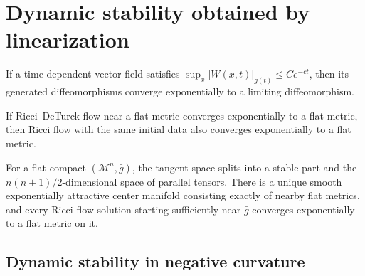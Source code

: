 \section{Dynamic stability obtained by linearization}

\begin{lemma}
\label{lem:chow-iv-deturck-diffeomorphism-convergence}
If a time-dependent vector field satisfies
$\sup_x|W(x,t)|_{g(t)}\le Ce^{-ct}$, then its generated diffeomorphisms
converge exponentially to a limiting diffeomorphism.
\end{lemma}

\begin{corollary}
\label{cor:chow-iv-deturck-to-ricci-flow}
If Ricci--DeTurck flow near a flat metric converges exponentially to a flat
metric, then Ricci flow with the same initial data also converges exponentially
to a flat metric.
\end{corollary}

\begin{theorem}[Asymptotic stability at $\Rm=0$ (Theorem 35.30)]
\label{thm:chow-iv-flat-asymptotic-stability}
For a flat compact $(\mathcal M^n,\bar g)$, the tangent space splits into a
stable part and the $n(n+1)/2$-dimensional space of parallel tensors.  There
is a unique smooth exponentially attractive center manifold consisting exactly
of nearby flat metrics, and every Ricci-flow solution starting sufficiently
near $\bar g$ converges exponentially to a flat metric on it.
\end{theorem}

\subsection{Dynamic stability in negative curvature}

